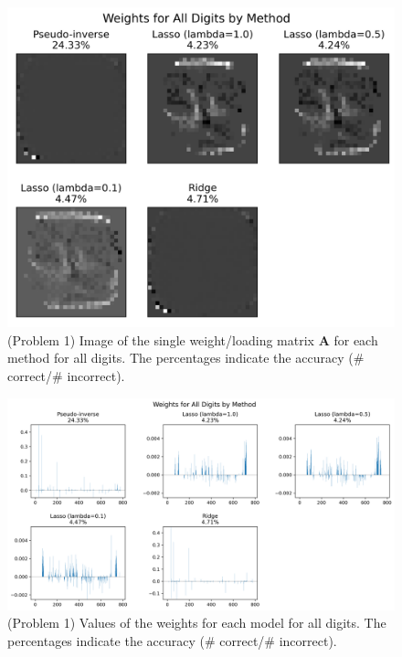 \documentclass[10pt]{article}
\begin{document}
\begin{figure}[ht]
\centerline{\includegraphics[scale=0.75]{figures/weights_matrix_accuracy_all_digits_all_methods.png}}
\caption{(Problem 1) Image of the single weight/loading matrix $\textbf{A}$ for each method for all digits. The percentages indicate the accuracy (\# correct/\# incorrect).}
\label{fig1}
\end{figure}

\begin{figure}[ht]
\centerline{\includegraphics[scale=0.5]{figures/bar_plot_loadings_all_digits_all_methods.png}}
\caption{(Problem 1) Values of the weights for each model for all digits. The percentages indicate the accuracy (\# correct/\# incorrect).}
\label{fig2}
\end{figure}
\end{document}
